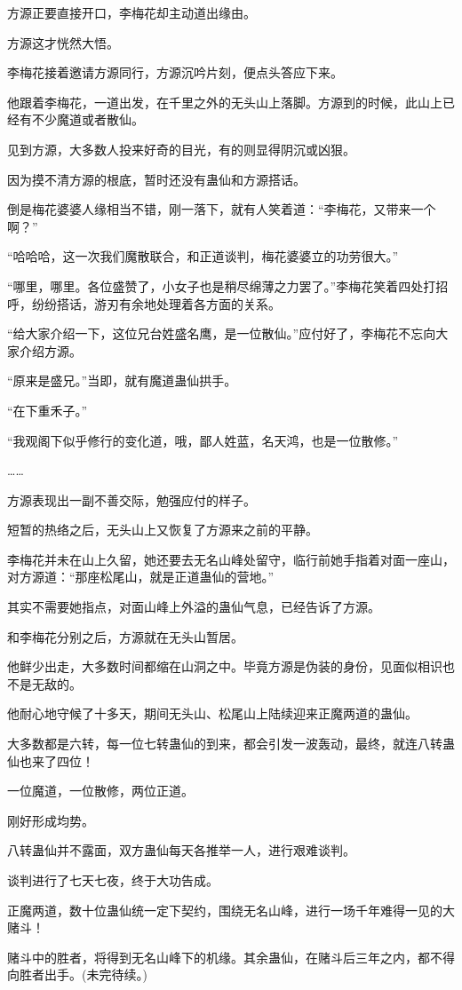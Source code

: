 \begin{this_body}
方源正要直接开口，李梅花却主动道出缘由。

方源这才恍然大悟。

李梅花接着邀请方源同行，方源沉吟片刻，便点头答应下来。

他跟着李梅花，一道出发，在千里之外的无头山上落脚。方源到的时候，此山上已经有不少魔道或者散仙。

见到方源，大多数人投来好奇的目光，有的则显得阴沉或凶狠。

因为摸不清方源的根底，暂时还没有蛊仙和方源搭话。

倒是梅花婆婆人缘相当不错，刚一落下，就有人笑着道：“李梅花，又带来一个啊？”

“哈哈哈，这一次我们魔散联合，和正道谈判，梅花婆婆立的功劳很大。”

“哪里，哪里。各位盛赞了，小女子也是稍尽绵薄之力罢了。”李梅花笑着四处打招呼，纷纷搭话，游刃有余地处理着各方面的关系。

“给大家介绍一下，这位兄台姓盛名鹰，是一位散仙。”应付好了，李梅花不忘向大家介绍方源。

“原来是盛兄。”当即，就有魔道蛊仙拱手。

“在下重禾子。”

“我观阁下似乎修行的变化道，哦，鄙人姓蓝，名天鸿，也是一位散修。”

……

方源表现出一副不善交际，勉强应付的样子。

短暂的热络之后，无头山上又恢复了方源来之前的平静。

李梅花并未在山上久留，她还要去无名山峰处留守，临行前她手指着对面一座山，对方源道：“那座松尾山，就是正道蛊仙的营地。”

其实不需要她指点，对面山峰上外溢的蛊仙气息，已经告诉了方源。

和李梅花分别之后，方源就在无头山暂居。

他鲜少出走，大多数时间都缩在山洞之中。毕竟方源是伪装的身份，见面似相识也不是无敌的。

他耐心地守候了十多天，期间无头山、松尾山上陆续迎来正魔两道的蛊仙。

大多数都是六转，每一位七转蛊仙的到来，都会引发一波轰动，最终，就连八转蛊仙也来了四位！

一位魔道，一位散修，两位正道。

刚好形成均势。

八转蛊仙并不露面，双方蛊仙每天各推举一人，进行艰难谈判。

谈判进行了七天七夜，终于大功告成。

正魔两道，数十位蛊仙统一定下契约，围绕无名山峰，进行一场千年难得一见的大赌斗！

赌斗中的胜者，将得到无名山峰下的机缘。其余蛊仙，在赌斗后三年之内，都不得向胜者出手。(未完待续。)

\end{this_body}

